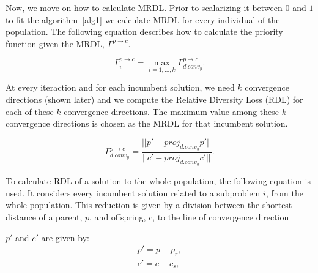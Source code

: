 Now, we move on how to calculate MRDL. Prior to scalarizing it between $0$ and $1$ to fit the algorithm~\ref{alg1} we calculate MRDL for every individual of the population. The following equation describes how to calculate the priority function given the MRDL, $\Gamma^{p \rightarrow c}$.


\vspace{-1em}
\begin{equation}
\Gamma_{i}^{p \rightarrow c} = \underset{i=1,...,k}{\max} \Gamma_{d.conv_{y}}^{p \rightarrow c}.
\end{equation}



At every iteraction and for each incumbent solution, we need $k$ convergence directions (shown later) and we compute the Relative Diversity Loss (RDL) for each of these $k$ convergence directions. The maximum value among these $k$ convergence directions is chosen as the MRDL for that incumbent solution.

\begin{equation}
\label{rdl}
\Gamma_{d.conv_{y}}^{p \rightarrow c} = \dfrac{ ||p \prime - proj_{d.conv_{y}}p \prime|| }{||c \prime - proj_{d.conv_{y}}c \prime||}.
\end{equation}

To calculate RDL of a solution to the whole population, the following equation is used. It considers every incumbent solution related to a subproblem $i$, from the whole population. This reduction is given by a division between the shortest distance of a parent, $p$,  and offspring, $c$, to the line of convergence direction


$p\prime$ and $c\prime $ are given by:
\vspace{-1em}
\begin{equation}
\begin{split}
p\prime = p - p_r,\\
c\prime = c - c_s,\\
\end{split}
\end{equation}


